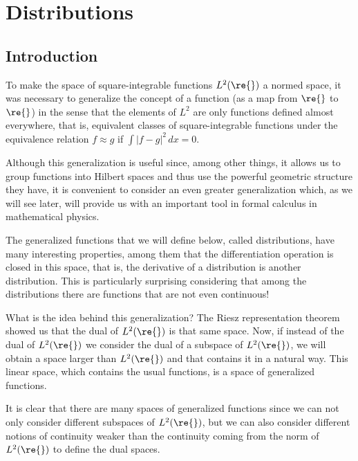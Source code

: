 

\chapter{Distributions}

\section{Introduction}

To make the space of square-integrable functions ${L}^2(\re{})$ a normed space, it was necessary to generalize the concept of a function (as a map from $\re{}$ to $\re{}$) in the sense that the elements of $L^2$ are only functions defined almost everywhere, that is, equivalent classes of square-integrable functions under the equivalence relation $f\approx g$ if $\int|f-g|^2\,dx=0$.

Although this generalization is useful since, among other things, it allows us to group functions into Hilbert spaces and thus use the powerful geometric structure they have, it is convenient to consider an even greater generalization which, as we will see later, will provide us with an important tool in formal calculus in mathematical physics.

The generalized functions that we will define below, called distributions, have many interesting properties, among them that the differentiation operation is closed in this space, that is, the derivative of a distribution is another distribution. This is particularly surprising considering that among the distributions there are functions that are not even continuous!

What is the idea behind this generalization? 
The Riesz representation theorem showed us that the dual of $L^2(\re{})$ is that same space. Now, if instead of the dual of $L^2(\re{})$ we consider the dual of a subspace of $L^2(\re{})$, we will obtain a space larger than $L^2(\re{})$ and that contains it in a natural way. This linear space, which contains the usual functions, is a space of generalized functions.

It is clear that there are many spaces of generalized functions since we can not only consider different subspaces of $L^2(\re{})$, but we can also consider different notions of continuity weaker than the continuity coming from the norm of $L^2(\re{})$ to define the dual spaces.

